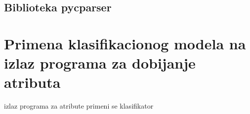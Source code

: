 \documentclass[12pt,oneside]{memoir}
\begin{document}
\subsection{Biblioteka pycparser}

\section{Primena klasifikacionog modela na izlaz programa za dobijanje atributa}

izlaz programa za atribute  
primeni se klasifikator












\end{document}
